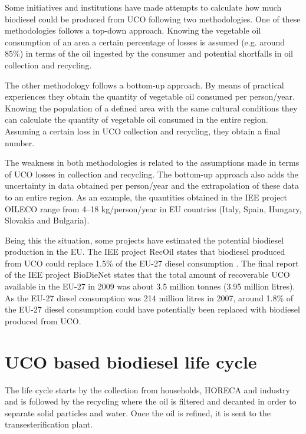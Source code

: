 \documentclass[sustainability,article,submit,moreauthors,pdftex,12pt,a4paper]{mdpi}
\begin{document}
Some initiatives and institutions have made attempts to calculate how much biodiesel could be produced from UCO following two methodologies. One of these methodologies follows a top-down approach. Knowing the vegetable oil consumption of an area a certain percentage of losses is assumed (e.g. around 85\%) in terms of the oil ingested by the consumer and potential shortfalls in oil collection and recycling.

The other methodology follows a bottom-up approach. By means of practical experiences they obtain the quantity of vegetable oil consumed per person/year. Knowing the population of a defined area with the same cultural conditions they can calculate the quantity of vegetable oil consumed in the entire region. Assuming a certain loss in UCO collection and recycling, they obtain a final number.

The weakness in both methodologies is related to the assumptions made in terms of UCO losses in collection and recycling. The bottom-up approach also adds the uncertainty in data obtained per person/year and the extrapolation of these data to an entire region. As an example, the quantities obtained in the IEE project OILECO range from 4--18 kg/person/year \cite{OILECO2013} in EU countries (Italy, Spain, Hungary, Slovakia and Bulgaria).
 
Being this the situation, some projects have estimated the potential biodiesel production in the EU. The IEE project RecOil states that biodiesel produced from UCO could replace 1.5\% of the EU-27 diesel consumption \cite{RecOil2013}. The final report of the IEE project BioDieNet \cite{BioDieNet2009} states that the total amount of recoverable UCO available in the EU-27 in 2009 was about 3.5 million tonnes (3.95 million litres). As the EU-27 diesel consumption was 214 million litres in 2007, around 1.8\% of the EU-27 diesel consumption could have potentially been replaced with biodiesel produced from UCO.


\section{UCO based biodiesel life cycle}

The life cycle starts by the collection from households, HORECA and industry and is followed by the recycling where the oil is filtered and decanted in order to separate solid particles and water. Once the oil is refined, it is sent to the transesterification plant.
 
\end{document}
